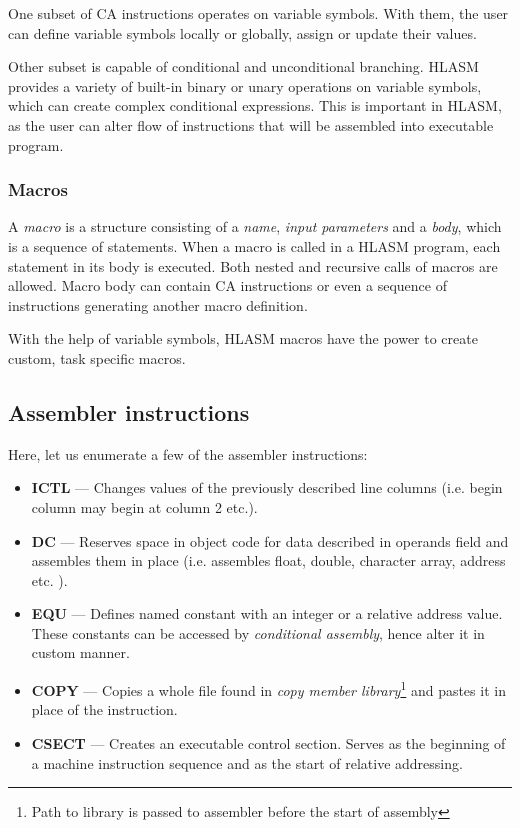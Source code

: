 One subset of CA instructions operates on variable symbols. With them, the user can define variable symbols locally or globally, assign or update their values.

Other subset is capable of conditional and unconditional branching. HLASM provides a variety of built-in binary or unary operations on variable symbols, which can create complex conditional expressions. This is important in HLASM, as the user can alter flow of instructions that will be assembled into executable program.

\subsubsection{Macros}

A \emph{macro} is a structure consisting of a \emph{name}, \emph{input parameters} and a \emph{body}, which is a sequence of statements. When a macro is called in a HLASM program, each statement in its body is executed. Both nested and recursive calls of macros are allowed. Macro body can contain CA instructions or even a sequence of instructions generating another macro definition.

With the help of variable symbols, HLASM macros have the power to create custom, task specific macros.

\subsection{Assembler instructions}
Here, let us enumerate a few of the assembler instructions:
\begin{itemize}
	\item \textbf{ICTL} --- Changes values of the previously described line columns (i.e. begin column may begin at column 2 etc.).
	
	\item \textbf{DC} --- Reserves space in object code for data described in operands field and assembles them in place (i.e. assembles float, double, character array, address etc. ).
	
	\item \textbf{EQU} --- Defines named constant with an integer or a relative address value. These constants can be accessed by \emph{conditional assembly}, hence alter it in custom manner.
	
	\item \textbf{COPY} --- Copies a whole file found in \emph{copy member library}\footnote{Path to library is passed to assembler before the start of assembly} and pastes it in place of the instruction.
	
	\item \textbf{CSECT} --- Creates an executable control section. Serves as the beginning of a machine instruction sequence and as the start of relative addressing.
\end{itemize}

